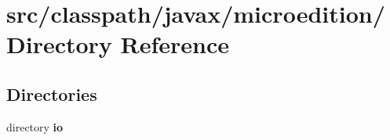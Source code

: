 \section{src/classpath/javax/microedition/ Directory Reference}
\label{dir_0590b9c5ffa27e66ce89001e0c147b37}
\subsection*{Directories}
\begin{DoxyCompactItemize}
\item 
directory {\bf io}
\end{DoxyCompactItemize}
